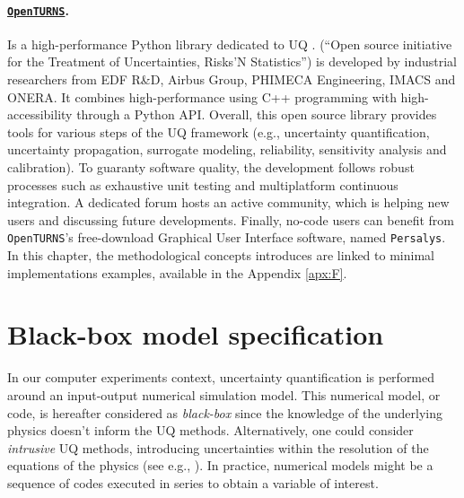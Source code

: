 \paragraph*{\href{https://openturns.github.io/www/}{\textbf{\texttt{OpenTURNS}}}\footnotemark.} 
Is a high-performance Python library dedicated to UQ \citep{baudin_dutfoy_2017}. 
\ot (``Open source initiative for the Treatment of Uncertainties, Risks’N Statistics'') is developed by industrial researchers from  EDF R\&D, Airbus Group, PHIMECA Engineering, IMACS and ONERA. 
It combines high-performance using C++ programming with high-accessibility through a Python API. 
Overall, this open source library provides tools for various steps of the UQ framework (e.g., uncertainty quantification, uncertainty propagation, surrogate modeling, reliability, sensitivity analysis and calibration). 
To guaranty software quality, the development follows robust processes such as exhaustive unit testing and multiplatform continuous integration. 
A dedicated forum hosts an active community, which is helping new users and discussing future developments. 
Finally, no-code users can benefit from \texttt{OpenTURNS}'s free-download Graphical User Interface software, named \texttt{Persalys}\footnotemark. 
In this chapter, the methodological concepts introduces are linked to minimal \ot implementations examples, available in the Appendix \ref{apx:F}. 


\section{Black-box model specification} \label{sec:model_spec}
In our computer experiments context, uncertainty quantification is performed around an input-output numerical simulation model. 
This numerical model, or code, is hereafter considered as \textit{black-box} since the knowledge of the underlying physics doesn't inform the UQ methods. 
Alternatively, one could consider \textit{intrusive} UQ methods, introducing uncertainties within the resolution of the equations of the physics (see e.g., \citet{lemaitre_2010}). 
In practice, numerical models might be a sequence of codes executed in series to obtain a variable of interest.

